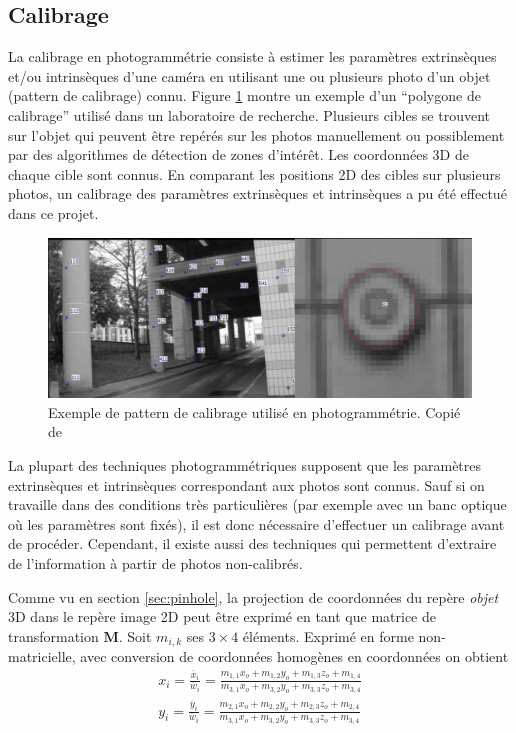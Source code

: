 \documentclass[a4paper,10pt]{scrreprt}
\begin{document}
\subsection{Calibrage}
La calibrage en photogrammétrie consiste à estimer les paramètres extrinsèques et/ou intrinsèques d'une caméra en utilisant une ou plusieurs photo d'un objet (pattern de calibrage) connu. \cite{Truc1998} Figure \ref{fig:calibration_pattern} montre un exemple d'un ``polygone de calibrage'' utilisé dans un laboratoire de recherche. \cite{Gard2009} Plusieurs cibles se trouvent sur l'objet qui peuvent être repérés sur les photos manuellement ou possiblement par des algorithmes de détection de zones d'intérêt. Les coordonnées 3D de chaque cible sont connus. En comparant les positions 2D des cibles sur plusieurs photos, un calibrage des paramètres extrinsèques et intrinsèques a pu été effectué dans ce projet.

\begin{figure}[p]
\includegraphics[width=\textwidth]{calibration_pattern.png}
\caption{Exemple de pattern de calibrage utilisé en photogrammétrie. Copié de \cite{Gard2009}}
\label{fig:calibration_pattern}
\end{figure}

La plupart des techniques photogrammétriques supposent que les paramètres extrinsèques et intrinsèques correspondant aux photos sont connus. Sauf si on travaille dans des conditions très particulières (par exemple avec un banc optique où les paramètres sont fixés), il est donc nécessaire d'effectuer un calibrage avant de procéder. Cependant, il existe aussi des techniques qui permettent d'extraire de l'information à partir de photos non-calibrés. \cite{Truc1998}

Comme vu en section \ref{sec:pinhole}, la projection de coordonnées du repère \emph{objet} 3D dans le repère image 2D peut être exprimé en tant que matrice de transformation $\mathbf{M}$. Soit $m_{i,k}$ ses $3 \times 4$ éléments. Exprimé en forme non-matricielle, avec conversion de coordonnées homogènes en coordonnées on obtient
\begin{equation}
\begin{gathered}
	x_i = \frac{\ddot{x_i}}{\ddot{w_i}} = \frac
		{m_{1,1} x_o + m_{1,2} y_o + m_{1,3} z_o + m_{1,4}}
		{m_{3,1} x_o + m_{3,2} y_o + m_{3,3} z_o + m_{3,4}} \\
	y_i = \frac{\ddot{y_i}}{\ddot{w_i}} = \frac
		{m_{2,1} x_o + m_{2,2} y_o + m_{2,3} z_o + m_{2,4}}
		{m_{3,1} x_o + m_{3,2} y_o + m_{3,3} z_o + m_{3,4}}
\end{gathered}
\end{equation}
\end{document}
